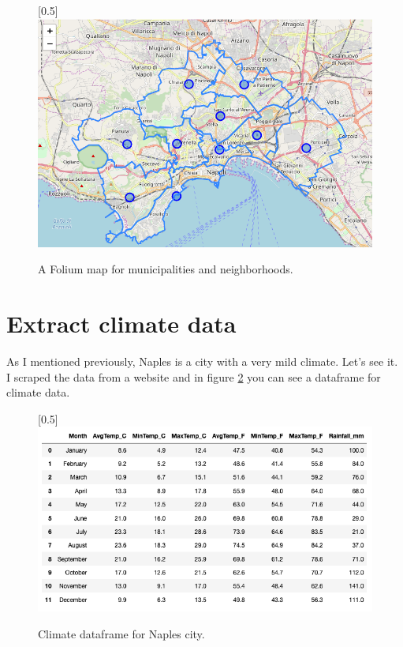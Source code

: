 \documentclass[a4paper, 12pt, oneside]{book}
\begin{document}
\begin{figure}[!htb]
		\centering
		\scalebox{0.45}[0.5]{\includegraphics{immagini/map_municipality.png}}
		\caption{A Folium map for municipalities and neighborhoods. }
		\label{fig:map_municipality}
	\end{figure}

\clearpage
\section*{Extract climate data}
\label{sec:climate}
As I mentioned previously, Naples is a city with a very mild climate. Let's see it. I scraped the data from a website \cite{climate} and in figure \ref{fig:df_climate} you can see a dataframe for climate data.



\begin{figure}[!htb]
		\centering
		\scalebox{0.45}[0.5]{\includegraphics{immagini/df_climate.png}}
		\caption{Climate dataframe for Naples city. }
		\label{fig:df_climate}
	\end{figure}
\end{document}
